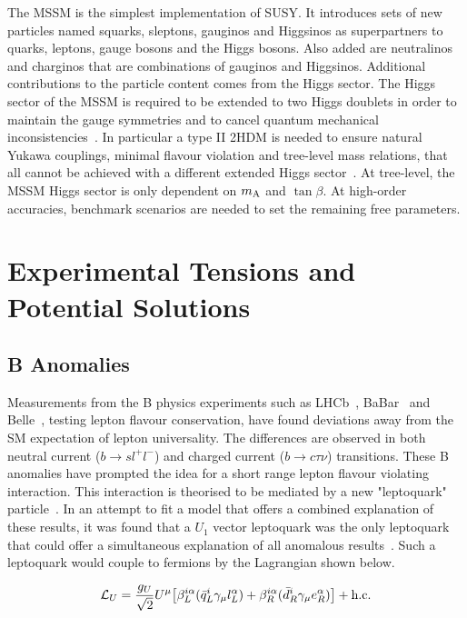The \ac{MSSM} is the simplest implementation of \ac{SUSY}.
It introduces sets of new particles named squarks, sleptons, gauginos and Higgsinos as superpartners to quarks, leptons, gauge bosons and the Higgs bosons.
Also added are neutralinos and charginos that are combinations of gauginos and Higgsinos.
Additional contributions to the particle content comes from the Higgs sector.
The Higgs sector of the \ac{MSSM} is required to be extended to two Higgs doublets in order to maintain the gauge symmetries and to cancel quantum mechanical inconsistencies~\cite{SUSY_Primer}.
In particular a type II \ac{2HDM} is needed to ensure natural Yukawa couplings, minimal flavour violation and tree-level mass relations, that all cannot be achieved with a different extended Higgs sector~\cite{SUSY_Primer}.
At tree-level, the \ac{MSSM} Higgs sector is only dependent on $m_{{\text{A}}}$ and $\tan\beta$.
At high-order accuracies, benchmark scenarios are needed to set the remaining free parameters.

\section{Experimental Tensions and Potential Solutions}

\subsection{B Anomalies}
\label{sec:b_anomalies}

Measurements from the B physics experiments such as LHCb~\cite{LHCb:2021trn,LHCb:2015gmp,LHCb:2017rln,LHCb:2017smo}, BaBar~\cite{Kowalewski:2013mna,BaBar:2013mob} and Belle~\cite{Belle:2015qfa,Belle:2016dyj}, testing lepton flavour conservation, have found deviations away from the \ac{SM} expectation of lepton universality.
The differences are observed in both neutral current ($b\rightarrow sl^{+}l^{-}$) and charged current ($b\rightarrow c\tau\nu$) transitions.
These B anomalies have prompted the idea for a short range lepton flavour violating interaction.
This interaction is theorised to be mediated by a new "leptoquark" particle~\cite{Diaz:2017lit,Schmaltz:2018nls}.
In an attempt to fit a model that offers a combined explanation of these results, it was found that a $U_{1}$ vector leptoquark was the only leptoquark that could offer a simultaneous explanation of all anomalous results~\cite{Cornella:2021sby}. 
Such a leptoquark would couple to fermions by the Lagrangian shown below.

\begin{equation}
\mathcal{L}_{U} = \frac{g_{U}}{\sqrt{2}} U^{\mu} \big[ \beta_{L}^{i\alpha}( \bar{q}_{L}^{i} \gamma_{\mu} l_{L}^{\alpha}) + \beta_{R}^{i\alpha}( \bar{d}_{R}^{i} \gamma_{\mu} e_{R}^{\alpha}) \big] + \text{h.c.}
\end{equation}


